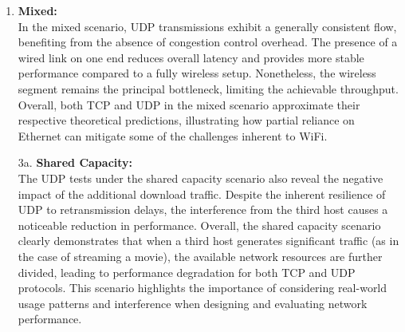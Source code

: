\begin{enumerate}
            \vspace{0.2cm} %

            \item \textbf{Mixed:} \\
                In the mixed scenario, UDP transmissions exhibit a generally consistent flow, benefiting from the absence of congestion control overhead. The presence of a wired link on one end reduces overall latency and provides more stable performance compared to a fully wireless setup. Nonetheless, the wireless segment remains the principal bottleneck, limiting the achievable throughput. Overall, both TCP and UDP in the mixed scenario approximate their respective theoretical predictions, illustrating how partial reliance on Ethernet can mitigate some of the challenges inherent to WiFi.
                
            \vspace{0.2cm} %
            
            \item[3a.] \textbf{Shared Capacity:} \\
                The UDP tests under the shared capacity scenario also reveal the negative impact of the additional download traffic.
                Despite the inherent resilience of UDP to retransmission delays, the interference from the third host causes a noticeable reduction in performance.  Overall, the shared capacity scenario clearly demonstrates that when a third host generates significant traffic (as in the case of streaming a movie), the available network resources are further divided, leading to performance degradation for both TCP and UDP protocols.  This scenario highlights the importance of considering real-world usage patterns and interference when designing and evaluating network performance.

        \end{enumerate}
